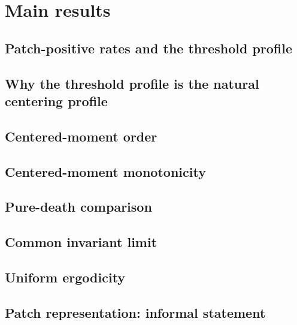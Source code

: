 \section{Main results}
\label{sec:main-results}

\subsection{Patch-positive rates and the threshold profile}

\subsection{Why the threshold profile is the natural centering profile}

\subsection{Centered-moment order}

\subsection{Centered-moment monotonicity}

\subsection{Pure-death comparison}

\subsection{Common invariant limit}

\subsection{Uniform ergodicity}

\subsection{Patch representation: informal statement}
